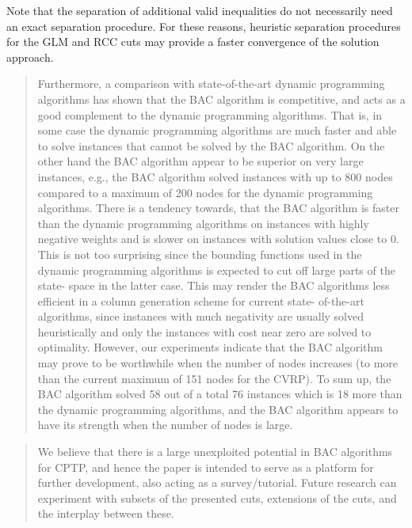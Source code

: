 Note that the separation of additional valid inequalities do not
necessarily need an exact separation procedure.
For these reasons, heuristic separation procedures for the GLM and RCC
cuts may provide a faster convergence of the solution approach.

\begin{quote}
	\cite{jepsen2014}
	Furthermore, a comparison with state-of-the-art dynamic programming algorithms has
	shown that the BAC algorithm is competitive, and acts as a good complement to the dynamic programming algorithms.
	That is, in some case the dynamic programming algorithms are much faster and able to solve instances that cannot be
	solved by the BAC algorithm. On the other hand the BAC algorithm appear to be superior on very large instances, e.g., the
	BAC algorithm solved instances with up to 800 nodes compared to a maximum of 200 nodes for the dynamic programming
	algorithms. There is a tendency towards, that the BAC algorithm is faster than the dynamic programming algorithms on
	instances with highly negative weights and is slower on instances with solution values close to 0. This is not too surprising
	since the bounding functions used in the dynamic programming algorithms is expected to cut off large parts of the state-
	space in the latter case. This may render the BAC algorithms less efficient in a column generation scheme for current state-
	of-the-art algorithms, since instances with much negativity are usually solved heuristically and only the instances with cost
	near zero are solved to optimality. However, our experiments indicate that the BAC algorithm may prove to be worthwhile
	when the number of nodes increases (to more than the current maximum of 151 nodes for the CVRP). To sum up, the BAC
	algorithm solved 58 out of a total 76 instances which is 18 more than the dynamic programming algorithms, and the BAC
	algorithm appears to have its strength when the number of nodes is large.
\end{quote}

\begin{quote}
	\cite{jepsen2014}
	We believe that there is a large unexploited potential in BAC algorithms for CPTP, and hence the paper is intended to
	serve as a platform for further development, also acting as a survey/tutorial. Future research can experiment with subsets
	of the presented cuts, extensions of the cuts, and the interplay between these.
\end{quote}

